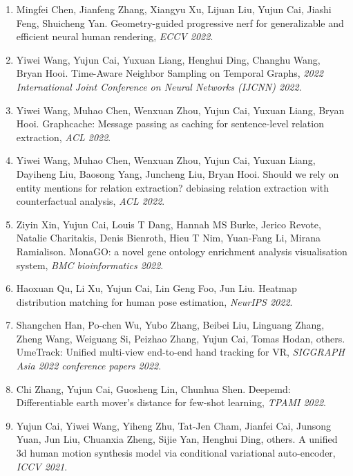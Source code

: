 \begin{enumerate}
\item Mingfei Chen, Jianfeng Zhang, Xiangyu Xu, Lijuan Liu, Yujun Cai, Jiashi Feng, Shuicheng Yan. Geometry-guided progressive nerf for generalizable and efficient neural human rendering, \textit{ECCV 2022}.

\item Yiwei Wang, Yujun Cai, Yuxuan Liang, Henghui Ding, Changhu Wang, Bryan Hooi. Time-Aware Neighbor Sampling on Temporal Graphs, \textit{2022 International Joint Conference on Neural Networks (IJCNN) 2022}.

\item Yiwei Wang, Muhao Chen, Wenxuan Zhou, Yujun Cai, Yuxuan Liang, Bryan Hooi. Graphcache: Message passing as caching for sentence-level relation extraction, \textit{ACL 2022}.

\item Yiwei Wang, Muhao Chen, Wenxuan Zhou, Yujun Cai, Yuxuan Liang, Dayiheng Liu, Baosong Yang, Juncheng Liu, Bryan Hooi. Should we rely on entity mentions for relation extraction? debiasing relation extraction with counterfactual analysis, \textit{ACL 2022}.

\item Ziyin Xin, Yujun Cai, Louis T Dang, Hannah MS Burke, Jerico Revote, Natalie Charitakis, Denis Bienroth, Hieu T Nim, Yuan-Fang Li, Mirana Ramialison. MonaGO: a novel gene ontology enrichment analysis visualisation system, \textit{BMC bioinformatics 2022}.

\item Haoxuan Qu, Li Xu, Yujun Cai, Lin Geng Foo, Jun Liu. Heatmap distribution matching for human pose estimation, \textit{NeurIPS 2022}.

\item Shangchen Han, Po-chen Wu, Yubo Zhang, Beibei Liu, Linguang Zhang, Zheng Wang, Weiguang Si, Peizhao Zhang, Yujun Cai, Tomas Hodan, others. UmeTrack: Unified multi-view end-to-end hand tracking for VR, \textit{SIGGRAPH Asia 2022 conference papers 2022}.

\item Chi Zhang, Yujun Cai, Guosheng Lin, Chunhua Shen. Deepemd: Differentiable earth mover's distance for few-shot learning, \textit{TPAMI 2022}.

\item Yujun Cai, Yiwei Wang, Yiheng Zhu, Tat-Jen Cham, Jianfei Cai, Junsong Yuan, Jun Liu, Chuanxia Zheng, Sijie Yan, Henghui Ding, others. A unified 3d human motion synthesis model via conditional variational auto-encoder, \textit{ICCV 2021}.


\end{enumerate}

